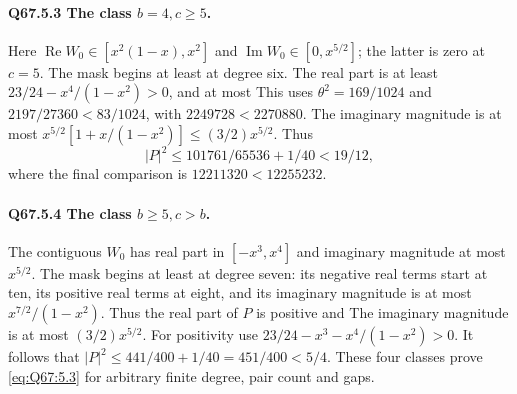 \paragraph{Q67.5.3 The class \(b=\allowbreak 4,\allowbreak c\ge\allowbreak 5\).}
Here \(\operatorname{Re}W_0\in[x^2(1-x),\allowbreak x^2]\) and
\(\operatorname{Im}W_0\in[0,\allowbreak x^{5/2}]\); the latter is zero at
\(c=\allowbreak 5\). The mask begins at least at degree six.
The real part is at least \(23/24-x^4/(1-x^2)>\allowbreak 0\), and at most
This uses \(\theta^2=\allowbreak 169/1024\) and
\(2197/27360<\allowbreak 83/1024\), with \(2249728<\allowbreak 2270880\).
The imaginary magnitude is at most
\(x^{5/2}[1+x/(1-x^2)]\le\allowbreak (3/2)x^{5/2}\). Thus
\begin{equation}\tag{Q67.5.5}\label{eq:Q67:5.5}
|P|^2\le101761/65536+1/40<19/12,
\end{equation}
where the final comparison is \(12211320<\allowbreak 12255232\).

\paragraph{Q67.5.4 The class \(b\ge\allowbreak 5,\allowbreak c>\allowbreak b\).}
The contiguous \(W_0\) has real part in \([-x^3,\allowbreak x^4]\) and imaginary
magnitude at most \(x^{5/2}\).
The mask begins at least at degree seven: its negative real terms
start at ten, its positive real terms at eight, and its imaginary
magnitude is at most \(x^{7/2}/(1-x^2)\).
Thus the real part of \(P\) is positive and
The imaginary magnitude is at most \((3/2)x^{5/2}\).
For positivity use \(23/24-x^3-x^4/(1-x^2)>\allowbreak 0\).
It follows that \(|P|^2\le\allowbreak 441/400+1/40=\allowbreak 451/400<\allowbreak 5/4\).
These four classes prove \eqref{eq:Q67:5.3} for arbitrary finite
degree, pair count and gaps.

